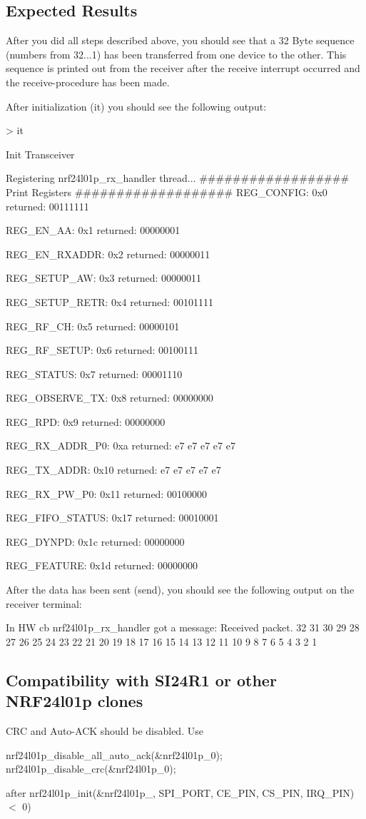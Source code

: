 \subsection*{Expected Results}

After you did all steps described above, you should see that a 32 Byte sequence (numbers from 32...1) has been transferred from one device to the other. This sequence is printed out from the receiver after the receive interrupt occurred and the receive-\/procedure has been made.

After initialization ({\ttfamily it}) you should see the following output\+:


\begin{DoxyCode}
 > it

Init Transceiver

Registering nrf24l01p\_rx\_handler thread...
################## Print Registers ###################
REG\_CONFIG:
0x0 returned: 00111111

REG\_EN\_AA:
0x1 returned: 00000001

REG\_EN\_RXADDR:
0x2 returned: 00000011

REG\_SETUP\_AW:
0x3 returned: 00000011

REG\_SETUP\_RETR:
0x4 returned: 00101111

REG\_RF\_CH:
0x5 returned: 00000101

REG\_RF\_SETUP:
0x6 returned: 00100111

REG\_STATUS:
0x7 returned: 00001110

REG\_OBSERVE\_TX:
0x8 returned: 00000000

REG\_RPD:
0x9 returned: 00000000

REG\_RX\_ADDR\_P0:
0xa returned: e7 e7 e7 e7 e7

REG\_TX\_ADDR:
0x10 returned: e7 e7 e7 e7 e7

REG\_RX\_PW\_P0:
0x11 returned: 00100000

REG\_FIFO\_STATUS:
0x17 returned: 00010001

REG\_DYNPD:
0x1c returned: 00000000

REG\_FEATURE:
0x1d returned: 00000000
\end{DoxyCode}


After the data has been sent ({\ttfamily send}), you should see the following output on the receiver terminal\+: 
\begin{DoxyCode}
In HW cb
nrf24l01p\_rx\_handler got a message: Received packet.
32 31 30 29 28 27 26 25 24 23 22 21 20 19 18 17 16 15 14 13 12 11 10 9 8 7 6 5 4 3 2 1
\end{DoxyCode}


\subsection*{Compatibility with S\+I24\+R1 or other N\+R\+F24l01p clones}

C\+RC and Auto-\/\+A\+CK should be disabled. Use 
\begin{DoxyCode}
nrf24l01p\_disable\_all\_auto\_ack(&nrf24l01p\_0);
nrf24l01p\_disable\_crc(&nrf24l01p\_0);
\end{DoxyCode}
 after {\ttfamily nrf24l01p\+\_\+init(\&nrf24l01p\+\_, S\+P\+I\+\_\+\+P\+O\+R\+T, C\+E\+\_\+\+P\+I\+N, C\+S\+\_\+\+P\+I\+N, I\+R\+Q\+\_\+\+P\+I\+N) $<$ 0)} 